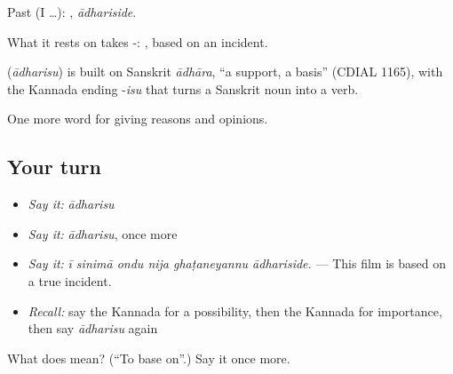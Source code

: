 Past (I …): , \emph{ādhariside}.

What it rests on takes -:  , based on an incident.

\begin{cousinweb}
\textbf{} (\emph{ādharisu}) is built on Sanskrit \emph{ādhāra}, \textquotedblleft{}a support, a basis\textquotedblright{} (CDIAL 1165), with the Kannada ending -\emph{isu} that turns a Sanskrit noun into a verb.
\end{cousinweb}

\begin{grammarlens}[title={What you've built}]
One more word for giving reasons and opinions.
\end{grammarlens}

\subsection*{Your turn}
\begin{itemize}
\raggedright
  \item \emph{Say it:} \emph{ādharisu}
  \item \emph{Say it:} \emph{ādharisu}, once more
  \item \emph{Say it:} \emph{ī sinimā ondu nija ghaṭaneyannu ādhariside.} — This film is based on a true incident.
  \item \emph{Recall:} say the Kannada for a possibility, then the Kannada for importance, then say \emph{ādharisu} again
\end{itemize}

\begin{tcolorbox}[breakable,colback=teal!4,colframe=teal!35!black,title={Before you move on}]
What does  mean? (\textquotedblleft{}To base on\textquotedblright{}.) Say it once more.
\end{tcolorbox}
